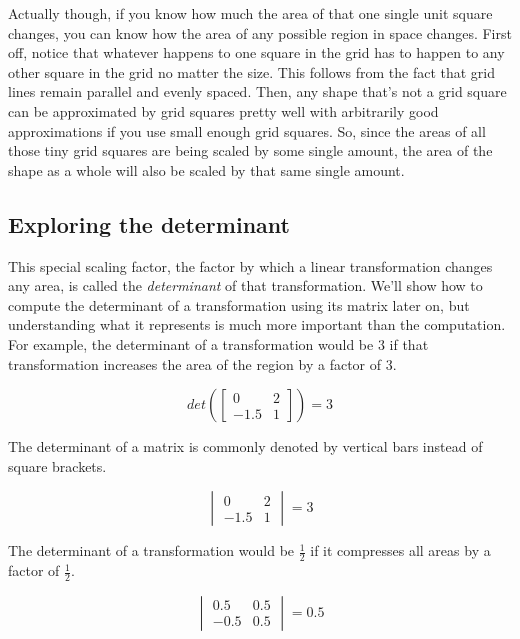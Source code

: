 Actually though, if you know how much the area of that one single unit square
changes, you can know how the area of any possible region in space changes.
First off, notice that whatever happens to one square in the grid has to happen
to any other square in the grid no matter the size. This follows from the fact
that grid lines remain parallel and evenly spaced. Then, any shape that's not a
grid square can be approximated by grid squares pretty well with arbitrarily
good approximations if you use small enough grid squares. So, since the areas of
all those tiny grid squares are being scaled by some single amount, the area of
the shape as a whole will also be scaled by that same single amount.

\subsection{Exploring the determinant}

This special scaling factor, the factor by which a linear transformation changes
any area, is called the \textit{determinant} of that transformation. We'll show
how to compute the determinant of a transformation using its matrix later on,
but understanding what it represents is much more important than the
computation. For example, the determinant of a transformation would be $3$ if
that transformation increases the area of the region by a factor of $3$.

\begin{equation*}
  det\left(\begin{bmatrix}
    0 & 2 \\
    -1.5 & 1
  \end{bmatrix}\right) = 3
\end{equation*}

The determinant of a matrix is commonly denoted by vertical bars instead of
square brackets.

\begin{equation*}
  \begin{vmatrix}
    0 & 2 \\
    -1.5 & 1
  \end{vmatrix} = 3
\end{equation*}

The determinant of a transformation would be $\frac{1}{2}$ if it compresses all
areas by a factor of $\frac{1}{2}$.

\begin{equation*}
  \begin{vmatrix}
    0.5 & 0.5 \\
    -0.5 & 0.5
  \end{vmatrix} = 0.5
\end{equation*}

